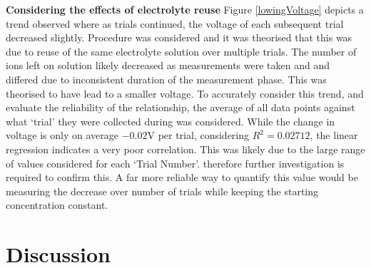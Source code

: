 \documentclass[10.5pt,a4paper]{article}
\begin{document}
\textbf{Considering the effects of electrolyte reuse}\newline
Figure \ref{lowingVoltage} depicts a trend observed where as trials continued, the voltage of each subsequent trial decreased slightly. Procedure was considered and it was theorised that this was due to reuse of the same electrolyte solution over multiple trials. The number of ions left on solution likely decreased as measurements were taken and and differed due to inconsistent duration of the measurement phase. This was theorised to have lead to a smaller voltage. To accurately consider this trend, and evaluate the reliability of the relationship, the average of all data points against what `trial' they were collected during was considered. While the change in voltage is only on average $-0.02$V per trial, considering $R^2=0.02712$, the linear regression indicates a very poor correlation. This was likely due to the large range of values considered for each `Trial Number'. therefore further investigation is required to confirm this. A far more reliable way to quantify this value would be measuring the decrease over number of trials while keeping the starting concentration constant.






\newpage
\section{Discussion}
\end{document}
